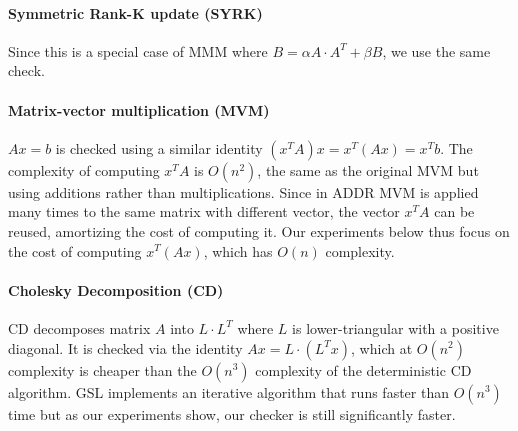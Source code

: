 \documentclass[10pt, conference, compsocconf]{IEEEtran}
\begin{document}
\paragraph{Symmetric Rank-K update (SYRK)}
Since this is a special case of MMM where $B = \alpha A \cdot A^T + \beta B$, %
we use the same check.

\paragraph{Matrix-vector multiplication (MVM)}
$Ax=b$ is checked using a similar identity $(x^TA)x = x^T(Ax) = x^Tb$.
The complexity of computing $x^TA$ is $O(n^2)$, the same as the original MVM but using additions rather than multiplications.
Since in ADDR MVM is applied many times to the same matrix with different vector, the vector $x^TA$ can be reused, amortizing the cost of computing it.
Our experiments below thus focus on the cost of computing $x^T(Ax)$, which has $O(n)$ complexity.

\paragraph{Cholesky Decomposition (CD)}
CD decomposes matrix $A$ into $L \cdot L^T$ where $L$ is lower-triangular with a positive diagonal.
It is checked via the identity $Ax = L \cdot (L^T x)$, which at $O(n^2)$ complexity is cheaper than the $O(n^3)$ complexity of the deterministic CD algorithm.
GSL implements an iterative algorithm that runs faster than $O(n^3)$ time but as our experiments show, our checker is still significantly faster.

\end{document}
